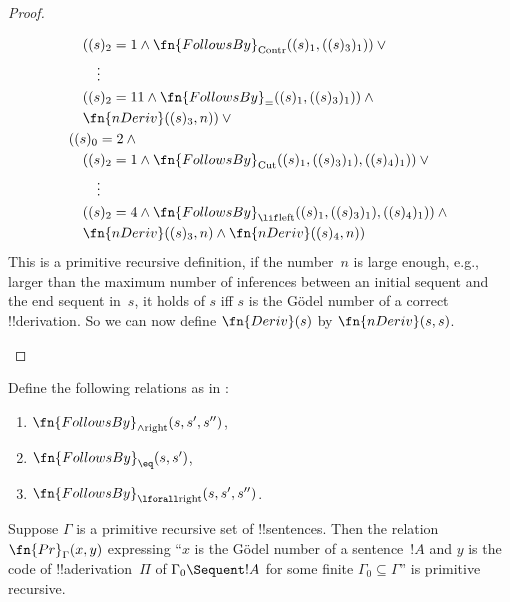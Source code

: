 \documentclass[../../include/open-logic-section]{subfiles}
\begin{document}
\begin{proof}
\begin{enumerate}
\begin{align*}
& \quad ((s)_2 = 1 \land \fn{FollowsBy}_{\text{Contr}}((s)_1, ((s)_3)_1)) \lor{}\\
& \qquad \vdots\\
& \quad ((s)_2 = 11 \land \fn{FollowsBy}_{=}((s)_1, ((s)_3)_1)) \land {}\\
& \quad \fn{nDeriv}((s)_3, n)) \lor {}\\
& ((s)_0 = 2 \land {}\\
& \quad ((s)_2 = 1 \land \fn{FollowsBy}_{\text{Cut}}((s)_1, ((s)_3)_1), ((s)_4)_1)) \lor{}\\
& \qquad \vdots\\
& \quad ((s)_2 = 4 \land \fn{FollowsBy}_{\lif\text{left}}((s)_1, ((s)_3)_1), ((s)_4)_1)) \land {}\\
& \quad \fn{nDeriv}((s)_3, n) \land \fn{nDeriv}((s)_4, n))
\end{align*}
This is a primitive recursive definition, if the number~$n$ is large
enough, e.g., larger than the maximum number of inferences between an
initial sequent and the end sequent in~$s$, it holds of $s$ iff $s$ is
the G\"odel number of a correct !!{derivation}.  So we can now define
$\fn{Deriv}(s)$ by $\fn{nDeriv}(s,s)$.
\end{enumerate}
\end{proof}

\begin{prob}
Define the following relations as in
:
\begin{enumerate}
\item $\fn{FollowsBy}_{\land\text{right}}(s, s', s'')$,
\item $\fn{FollowsBy}_{\eq}(s, s')$,
\item $\fn{FollowsBy}_{\lforall\text{right}}(s, s', s'')$.
\end{enumerate}
\end{prob}

\begin{prop}
Suppose $\Gamma$ is a primitive recursive set of !!{sentence}s.  Then
the relation $\fn{Pr}_\Gamma(x, y)$ expressing ``$x$ is the G\"odel
number of a sentence~$!A$ and $y$ is the code of !!a{derivation}~$\Pi$
of $\Gamma_0 \Sequent !A$ for some finite $\Gamma_0 \subseteq
\Gamma$'' is primitive recursive.
\end{prop}
\end{document}
